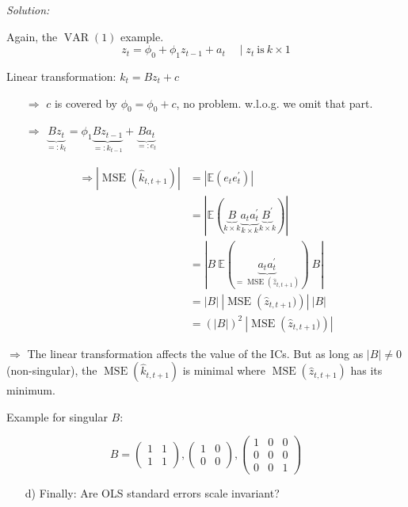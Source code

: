 \documentclass[12pt,a4paper]{article}
\newcommand{\MSE}{\operatorname{MSE}} %
\newcommand{\VAR}{\operatorname{VAR}} %
\begin{document}
\emph{Solution:}

Again, the \(\VAR(1)\) example.
\[z_t = \phi_0 + \phi_1 z_{t-1} +a_t \quad \mid z_t \ \text{is} \ k \times 1 \]

Linear transformation: \(k_t = B z_t + c\)

\begin{itemize}
  \item[$\Rightarrow$] $c$ is covered by $\phi_0 = \phi_0 + c$, no problem. w.l.o.g. we omit that part.
  \item[$\Rightarrow$] $\underbrace{B z_t}_{=: k_t} = \phi_1 \underbrace{B z_{t-1}}_{=: k_{t-1}} + \underbrace{B a_t}_{=: e_t}$
\end{itemize}

\begin{align*}
  \Rightarrow \left| \MSE \left(\hat{k}_{t, t+1} \right) \right| & = \left| \mathbb{E} \left(e_t e_t^{'} \right) \right| \\
  & = \left| \mathbb{E} \left(\underbrace{B}_{k \times k} \underbrace{a_t a_t^{'}}_{k \times k} \underbrace{B^{'}}_{k \times k}\right) \right|\\
  & = \left| B \ \mathbb{E} \left( \underbrace{a_t a_t^{'} }_{= \MSE (\hat{z}_{t, t+1})}\right) \ B \right|\\
  & = \left| B \right| \ \left| \MSE \left( \hat{z}_{t, t+1}) \right) \right| \ \left| B \right| \\
  & = \left(\left| B \right|\right)^2 \ \left| \MSE \left( \hat{z}_{t, t+1}) \right) \right| 
\end{align*}

\(\Rightarrow\) The linear transformation affects the value of the ICs.
But as long as \(|B| \neq 0\) (non-singular), the
\(\MSE\left( \hat{k}_{t,t+1} \right)\) is minimal where
\(\MSE\left( \hat{z}_{t,t+1} \right)\) has its minimum.

Example for singular \(B\):

\[B = \begin{pmatrix} 1 & 1 \\ 1 & 1 \end{pmatrix}, \begin{pmatrix} 1 & 0 \\ 0 & 0 \end{pmatrix}, \begin{pmatrix} 1 & 0 & 0 \\ 0 & 0 & 0 \\ 0 & 0 & 1 \end{pmatrix}\]

\begin{itemize}
  \item[d)] Finally: Are OLS standard errors scale invariant? 
\end{itemize}
\end{document}
